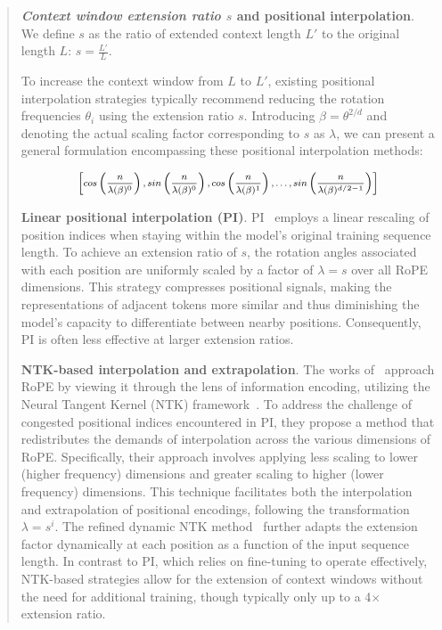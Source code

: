 \begin{abstract}
\textbf{\emph{Context window extension ratio $s$} and positional interpolation}. We define $s$ as  the ratio of extended context length $L'$ to the original length $L$: $s=\frac{L'}{L}$. 

To increase the context window from $L$ to $L'$, existing positional interpolation strategies typically recommend reducing the rotation frequencies $\theta_i$ using the extension ratio $s$. Introducing $\beta=\theta^{2/d}$ and denoting the actual scaling factor corresponding to $s$ as $\lambda$, we can present a general formulation encompassing these positional interpolation methods:

\begin{equation}	
	\fontsize{7.5}{7.5} \selectfont
	\label{eq:unified_rope}
	\begin{aligned}
		\left[cos\left(\frac{n}{\lambda(\beta)^0}\right), sin \left(\frac{n}{\lambda(\beta)^0}\right), cos\left(\frac{n}{\lambda(\beta)^1}\right), \ldots,  sin \left(\frac{n}{\lambda(\beta)^{d/2-1}}\right) \right]   
	\end{aligned}
\end{equation}

\textbf{Linear positional interpolation (PI)}. PI~\cite{pi} employs a linear rescaling of position indices when staying within the model's original training sequence length. To achieve an extension ratio of $s$, the rotation angles associated with each position are uniformly scaled by a factor of $\lambda=s$ over all RoPE dimensions. This strategy compresses positional signals, making the representations of adjacent tokens more similar and thus diminishing the model's capacity to differentiate between nearby positions. Consequently, PI is often less effective at larger extension ratios.

\textbf{NTK-based interpolation and extrapolation}. The works of~\cite{ntk,dynamicntk} approach RoPE by viewing it through the lens of information encoding, utilizing the Neural Tangent Kernel (NTK) framework~\cite{jacot2018neural,tancik2020fourier}. To address the challenge of congested positional indices encountered in PI, they propose a method that redistributes the demands of interpolation across the various dimensions of RoPE. Specifically, their approach involves applying less scaling to lower (higher frequency) dimensions and greater scaling to higher (lower frequency) dimensions. This technique facilitates both the interpolation and extrapolation of positional encodings, following the transformation $\lambda=s^{i}$. The refined dynamic NTK method~\cite{dynamicntk} further adapts the extension factor dynamically at each position as a function of the input sequence length. In contrast to PI, which relies on fine-tuning to operate effectively, NTK-based strategies allow for the extension of context windows without the need for additional training, though typically only up to a 4$\times$ extension ratio.


\end{abstract}
